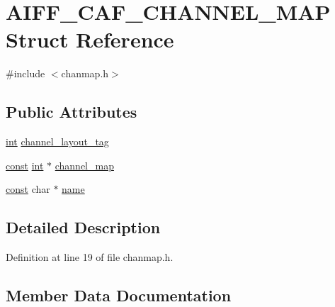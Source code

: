 \hypertarget{struct_a_i_f_f___c_a_f___c_h_a_n_n_e_l___m_a_p}{}\section{A\+I\+F\+F\+\_\+\+C\+A\+F\+\_\+\+C\+H\+A\+N\+N\+E\+L\+\_\+\+M\+AP Struct Reference}
\label{struct_a_i_f_f___c_a_f___c_h_a_n_n_e_l___m_a_p}


{\ttfamily \#include $<$chanmap.\+h$>$}

\subsection*{Public Attributes}
\begin{DoxyCompactItemize}
\item 
\hyperlink{xmltok_8h_a5a0d4a5641ce434f1d23533f2b2e6653}{int} \hyperlink{struct_a_i_f_f___c_a_f___c_h_a_n_n_e_l___m_a_p_a3976dbc88edbc362faaf5fec55f0ddd9}{channel\+\_\+layout\+\_\+tag}
\item 
\hyperlink{getopt1_8c_a2c212835823e3c54a8ab6d95c652660e}{const} \hyperlink{xmltok_8h_a5a0d4a5641ce434f1d23533f2b2e6653}{int} $\ast$ \hyperlink{struct_a_i_f_f___c_a_f___c_h_a_n_n_e_l___m_a_p_ad4b36db2fe99cc028d6d3e3f2dc1d04c}{channel\+\_\+map}
\item 
\hyperlink{getopt1_8c_a2c212835823e3c54a8ab6d95c652660e}{const} char $\ast$ \hyperlink{struct_a_i_f_f___c_a_f___c_h_a_n_n_e_l___m_a_p_aa459de05ddd640ed5b78c1237b15b443}{name}
\end{DoxyCompactItemize}


\subsection{Detailed Description}


Definition at line 19 of file chanmap.\+h.



\subsection{Member Data Documentation}
